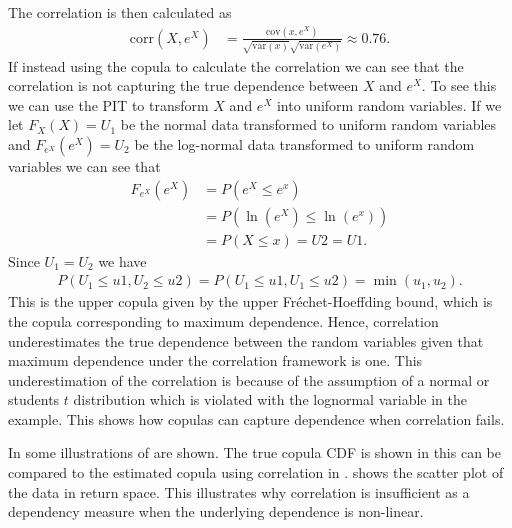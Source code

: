 \begin{example}
    The correlation is then calculated as
    \begin{align*}
        \mathrm{corr}(X,e^X) &= \frac{\mathrm{cov}(x,e^X)}{\sqrt{\mathrm{var}(x)} \sqrt{\mathrm{var}(e^X)}}  \approx 0.76. 
    \end{align*}
    If instead using the copula to calculate the correlation we can see that the correlation is not capturing the true dependence between $X$ and $e^X$. To see this we can use the \gls{PIT} to transform $X$ and $e^X$ into uniform random variables. If we let $F_X(X)=U_1$ be the normal data transformed to uniform random variables and $F_{e^X}(e^X)=U_2$ be the log-normal data transformed to uniform random variables we can see that 
    \begin{align*}
        F_{e^X}(e^X) &= P(e^X \leq e^x)\\
        &= P(\ln(e^X) \leq \ln (e^x))\\
        &=P(X\leq x) = U2 = U1.
    \end{align*}
    Since $U_1 = U_2$ we have 
    \begin{align*}
        P(U_1\leq u1, U_2\leq u2) = P(U_1\leq u1, U_1\leq u2) = \min(u_1,u_2).
    \end{align*}
    This is the upper copula given by the upper Fréchet-Hoeffding bound, which is the copula corresponding to maximum dependence. Hence, correlation underestimates the true dependence between the random variables given that maximum dependence under the correlation framework is one. This underestimation of the correlation is because of the assumption of a normal or students $t$ distribution which is violated with the lognormal variable in the example. This shows how copulas can capture dependence when correlation fails. 

    In  some illustrations of  are shown. The true copula \gls{CDF} is shown in  this can be compared to the estimated copula using correlation in . %
     shows the scatter plot of the data in return space. This illustrates why correlation is insufficient as a dependency measure when the underlying dependence is non-linear. 
    

\end{example}
